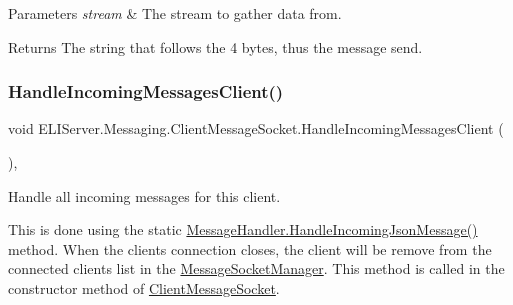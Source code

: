\begin{DoxyParams}{Parameters}
{\em stream} & The stream to gather data from.\\
\hline
\end{DoxyParams}
\begin{DoxyReturn}{Returns}
The string that follows the 4 bytes, thus the message send.
\end{DoxyReturn}
\mbox{\label{class_e_l_i_server_1_1_messaging_1_1_client_message_socket_a3d83f53c3a99a74cc67092265a9d75ea}} 
\subsubsection{\texorpdfstring{Handle\+Incoming\+Messages\+Client()}{HandleIncomingMessagesClient()}}
{\footnotesize\ttfamily void E\+L\+I\+Server.\+Messaging.\+Client\+Message\+Socket.\+Handle\+Incoming\+Messages\+Client (\begin{DoxyParamCaption}{ }\end{DoxyParamCaption})\hspace{0.3cm}{\ttfamily [inline]}, {\ttfamily [private]}}





Handle all incoming messages for this client.

This is done using the static \hyperlink{class_e_l_i_server_1_1_messaging_1_1_message_handler_a54b8fc68511fe197932338c0ffdb75c0}{Message\+Handler.\+Handle\+Incoming\+Json\+Message()} method. When the clients\textquotesingle{} connection closes, the client will be remove from the connected clients list in the \hyperlink{class_e_l_i_server_1_1_message_socket_manager}{Message\+Socket\+Manager}. This method is called in the constructor method of \hyperlink{class_e_l_i_server_1_1_messaging_1_1_client_message_socket}{Client\+Message\+Socket}. \mbox{\label{class_e_l_i_server_1_1_messaging_1_1_client_message_socket_a6068ed137f8fa6fcafcfe24764444ca5}} 
